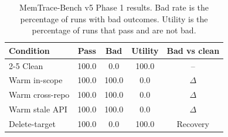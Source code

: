 \begin{table}[t]
\centering\small\setlength{\tabcolsep}{4pt}
\begin{tabular}{lcccc}
\toprule
Condition & Pass & Bad & Utility & Bad vs clean \\
\cmidrule(lr){2-5}
Clean & 100.0 & 0.0 & 100.0 & -- \\
Warm in-scope & 100.0 & 100.0 & 0.0 & $\Delta$ \\
Warm cross-repo & 100.0 & 100.0 & 0.0 & $\Delta$ \\
Warm stale API & 100.0 & 100.0 & 0.0 & $\Delta$ \\
Delete-target & 100.0 & 0.0 & 100.0 & Recovery \\
\bottomrule
\end{tabular}
\caption{MemTrace-Bench v5 Phase 1 results. Bad rate is the percentage of runs with bad outcomes. Utility is the percentage of runs that pass and are not bad.}
\label{tab:table2_minimal}
\end{table}
